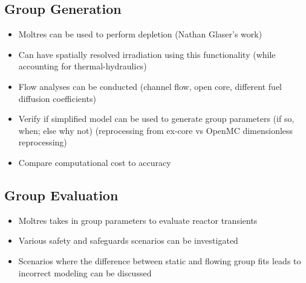 \subsection{Group Generation}

\begin{itemize}
    \item Moltres can be used to perform depletion (Nathan Glaser's work)
    \item Can have spatially resolved irradiation using this functionality (while accounting for thermal-hydraulics)
    \item Flow analyses can be conducted (channel flow, open core, different fuel diffusion coefficients)
    \item Verify if simplified model can be used to generate group parameters (if so, when; else why not) (reprocessing from ex-core vs OpenMC dimensionless reprocessing)
    \item Compare computational cost to accuracy
\end{itemize}

\subsection{Group Evaluation}

\begin{itemize}
    \item Moltres takes in group parameters to evaluate reactor transients
    \item Various safety and safeguards scenarios can be investigated
    \item Scenarios where the difference between static and flowing group fits leads to incorrect modeling can be discussed
\end{itemize}
